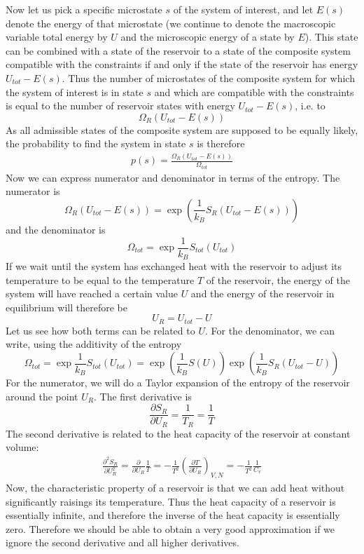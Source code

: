 \documentclass[a4paper, draft]{report}
\numberwithin{section}{chapter}
\numberwithin{equation}{chapter}
\theoremstyle{own}
\theoremstyle{remark}
\begin{document}
Now let us pick a specific microstate $s$ of the system of interest, and let $E(s)$ denote the energy of that microstate (we continue to denote the macroscopic variable total energy by $U$ and the microscopic energy of a state by $E$). This state can be combined with a state of the reservoir to  a state of the composite system compatible with the constraints if and only if the state of the reservoir has energy $U_{tot} - E(s)$. Thus the number of microstates of the composite system for which the system of interest is in state $s$ and which are compatible with the constraints is equal to the number of reservoir states with energy $U_{tot} - E(s)$, i.e. to
$$
\Omega_R(U_{tot} - E(s))
$$
As all admissible states of the composite system are supposed to be equally likely, the probability to find the system in state $s$ is therefore
\begin{align}\label{eq:probsubsystem}
p(s) = \frac{\Omega_R(U_{tot} - E(s))}{\Omega_{tot}}
\end{align}
Now we can express numerator and denominator in terms of the entropy. The numerator is
$$
\Omega_R(U_{tot} - E(s)) = \exp(\frac{1}{k_B} S_R(U_{tot} - E(s)))
$$
and the denominator is
$$
\Omega_{tot} = \exp \frac{1}{k_B} S_{tot}(U_{tot}) 
$$
If we wait until the system has exchanged heat with the reservoir to adjust its temperature to be equal to the temperature $T$ of the reservoir, the energy of the system will have reached a certain value $U$ and the energy of the reservoir in equilibrium will therefore be 
$$
U_R = U_{tot} - U
$$
Let us see how both terms can be related to $U$. For the denominator, we can write, using the additivity of the entropy
$$
\Omega_{tot} = \exp \frac{1}{k_B} S_{tot}(U_{tot}) = \exp(\frac{1}{k_B} S(U)) \exp(\frac{1}{k_B} S_R(U_{tot} - U))
$$
For the numerator, we will do a Taylor expansion of the entropy of the reservoir around the point $U_R$. The first derivative is
$$
\frac{\partial S_R}{\partial U_R} = \frac{1}{T_R} = \frac{1}{T}
$$
The second derivative is related to the heat capacity of the reservoir at constant volume:
\begin{align*}
\frac{\partial^2 S_R}{\partial U_R^2} = \frac{\partial}{\partial U_R} \frac{1}{T} 
= - \frac{1}{T^2} (\frac{\partial T}{\partial U_R})_{V,N} 
= - \frac{1}{T^2} \frac{1}{C_v}
\end{align*}
Now, the characteristic property of a reservoir is that we can add heat without significantly raisings its temperature. Thus the heat capacity of a reservoir is essentially infinite, and therefore the inverse of the heat capacity is essentially zero. Therefore we should be able to obtain a very good approximation if we ignore the second derivative and all higher derivatives.
\end{document}

